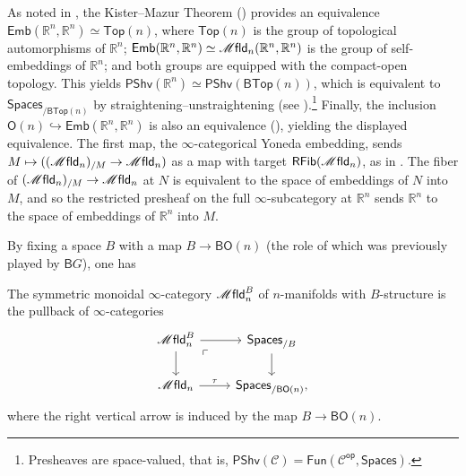 \documentclass[../text]{subfiles}
\begin{document}
\begin{remark}\label{rem:explaining_tau}
    As noted in \cite{af_fhtop}, the Kister--Mazur Theorem (\cite{kister1964microbundles}) provides an equivalence $\mathsf{Emb}(\mathbb{R}^n,\mathbb{R}^n)\simeq \mathsf{Top}(n)$, where $\mathsf{Top}(n)$ is the group of topological automorphisms of $\mathbb{R}^n$; $\mathsf{Emb}(\mathbb{R}^n,\mathbb{R}^n)\simeq\mfld_n(\mathbb{R}^n,\mathbb{R}^n)$ is the group of self-embeddings of $\mathbb{R}^n$; and both groups are equipped with the compact-open topology. This yields $\mathsf{PShv}(\mathbb{R}^n)\simeq\mathsf{PShv}(\mathsf{BTop}(n))$, which is equivalent to $\mathsf{Spaces}_{/\mathsf{BTop}(n)}$ by straightening--unstraightening (see ).\footnote{Presheaves are space-valued, that is, $\mathsf{PShv}(\mathscr{C})=\mathsf{Fun}(\mathscr{C}^{\mathsf{op}},\mathsf{Spaces})$.} Finally, the inclusion $\mathsf{O}(n)\hookrightarrow\mathsf{Emb}(\mathbb{R}^n,\mathbb{R}^n)$ is also an equivalence (\cite[Proposition 2.2.6]{af_primer}), yielding the displayed equivalence. The first map, the $\infty$-categorical Yoneda embedding, sends $M\mapsto((\mfld_{n})_{/M}\to\mfld_n)$ as a map with target $\mathsf{RFib}(\mfld_n)$, as in \cite{lurie_htt}. The fiber of $(\mfld_{n})_{/M}\to\mfld_n$ at $N$ is equivalent to the space of embeddings of $N$ into $M$, and so the restricted presheaf on the full $\infty$-subcategory at $\mathbb{R}^n$ sends $\mathbb{R}^n$ to the space of embeddings of $\mathbb{R}^n$ into $M$. 
\end{remark}

By fixing a space $B$ with a map $B \rightarrow \mathsf{BO}(n)$ (the role of which was previously played by $\mathsf{B}G$), one has
%
\begin{definition}
    The symmetric monoidal $\infty$-category $\mfld_n^B$ of $n$-manifolds with $B$-structure is the pullback of $\infty$-categories
    \begin{equation}
        \begin{tikzcd}
            \mfld_n^B \arrow[dr, phantom, "\ulcorner", very near start] \arrow[r] \arrow[d] & \mathsf{Spaces}_{/B} \arrow[d] \\
            \mfld_n \arrow[r, "\tau"] & \mathsf{Spaces}_{/\mathsf{BO}(n)},
        \end{tikzcd}
    \end{equation}
    where the right vertical arrow is induced by the map $B \rightarrow \mathsf{BO}(n)$.
\end{definition}
\end{document}
